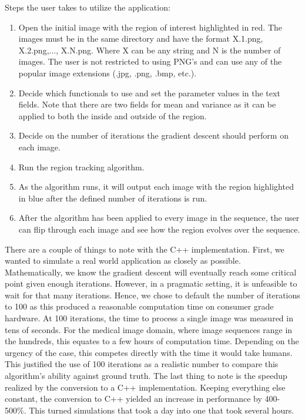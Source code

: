 \documentclass{article}
\begin{document}
    Steps the user takes to utilize the application:
    \begin{enumerate}
    	\item Open the initial image with the region of interest highlighted in red. The images must be in the same directory and have the format X.1.png, X.2.png,..., X.N.png. Where X can be any string and N is the number of images. The user is not restricted to using PNG's and can use any of the popular image extensions (.jpg, .png, .bmp, etc.).
        \item Decide which functionals to use and set the parameter values in the text fields. Note that there are two fields for mean and variance as it can be applied to both the inside and outside of the region.
        \item Decide on the number of iterations the gradient descent should perform on each image.
        \item Run the region tracking algorithm.
        \item As the algorithm runs, it will output each image with the region highlighted in blue after the defined number of iterations is run.
        \item After the algorithm has been applied to every image in the sequence, the user can flip through each image and see how the region evolves over the sequence.
	\end{enumerate}    
    
    There are a couple of things to note with the C++ implementation. First, we wanted to simulate a real world application as closely as possible. Mathematically, we know the gradient descent will eventually reach some critical point given enough iterations. However, in a pragmatic setting, it is unfeasible to wait for that many iterations. Hence, we chose to default the number of iterations to 100 as this produced a reasonable computation time on consumer grade hardware. At 100 iterations, the time to process a single image was measured in tens of seconds. For the medical image domain, where image sequences range in the hundreds, this equates to a few hours of computation time. Depending on the urgency of the case, this competes directly with the time it would take humans. This justified the use of 100 iterations as a realistic number to compare this algorithm's ability against ground truth. The last thing to note is the speedup realized by the conversion to a C++ implementation. Keeping everything else constant, the conversion to C++ yielded an increase in performance by 400-500\%. This turned simulations that took a day into one that took several hours.
\end{document}

